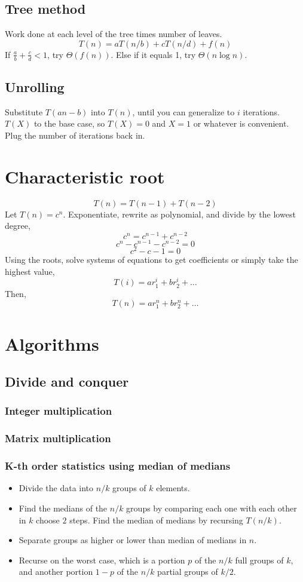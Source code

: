 \subsection{Tree method}
Work done at each level of the tree times number of leaves.
$$T(n) = aT(n/b) + cT(n/d) + f(n)$$
If $\frac{a}{b} + \frac{c}{d} < 1$, try $\Theta(f(n))$. Else if it equals 1, try $\Theta(n\log n)$.

\subsection{Unrolling}
Substitute $T(an-b)$ into $T(n)$, until you can generalize to $i$ iterations. $T(X)$ to the base case, so $T(X)=0$ and $X=1$ or whatever is convenient. Plug the number of iterations back in.

\section{Characteristic root}
$$T(n) = T(n-1) + T(n-2)$$
Let $T(n) = c^n$.
Exponentiate, rewrite as polynomial, and divide by the lowest degree,
$$c^n = c^{n-1} + c^{n-2}$$
$$c^n - c^{n-1} - c^{n-2} = 0$$
$$c^2 - c - 1 = 0$$
Using the roots, solve systems of equations to get coefficients or simply take the highest value,
$$T(i) = ar_1^i + br_2^i + \dots$$
Then,
$$T(n) = ar_1^n + br_2^n + \dots$$




\section{Algorithms}
\subsection{Divide and conquer}
\subsubsection{Integer multiplication}
\subsubsection{Matrix multiplication}
\subsubsection{K-th order statistics using median of medians}
\begin{itemize}
    \item Divide the data into $n/k$ groups of $k$ elements. 
    \item Find the medians of the $n/k$ groups by comparing each one with each other in $k$ choose $2$ steps. Find the median of medians by recursing $T(n/k)$.
    \item Separate groups as higher or lower than median of medians in $n$. 
    \item Recurse on the worst case, which is a portion $p$ of the $n/k$ full groups of $k$, and another portion $1-p$ of the $n/k$ partial groups of $k/2$.
\end{itemize}

